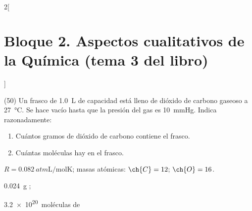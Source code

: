 \documentclass[10pt]{article}
\newenvironment{gexdatos}{
  \noindent\makebox[0pt][r]{\textit{Datos:}}
  }{\vspace{5pt}}
\begin{document}
\begin{multicols}{2}[
    \section{Bloque 2. Aspectos cualitativos de la Química (tema 3 del libro)}
  ]
\begin{exercise}[
    tags    = {},
    topics  = {química,química básica},
    source  = {FQ 1B MGH 2016, p85, e26},
  ]
  (50) Un frasco de \SI{1.0}{\liter} de capacidad está lleno de dióxido de carbono gaseoso a \SI{27}{\celsius}. Se hace vacío hasta que la presión del
  gas es \SI{10}{\mmHg}. Indica razonadamente:

  \begin{enumerate}
    \item Cuántos gramos de dióxido de carbono contiene el frasco.
    \item Cuántas moléculas hay en el frasco.
  \end{enumerate}

  \begin{gexdatos}
    \( R = \SI{0.082}{atm\liter\per\mole\kelvin} \); masas atómicas: \( \ch{C} = 12 \); \( \ch{O} = 16 \).
  \end{gexdatos}
\end{exercise}

\begin{solution}
  \begin{enumerate*}
    \item \SI{0.024}{\gram} ;
    \item \SI{3.2e20}{moléculas} de 
  \end{enumerate*}
\end{solution}

\end{multicols}
\end{document}
